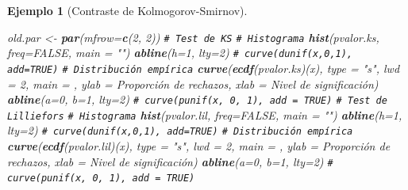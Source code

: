 \documentclass[
]{book}
\newenvironment{Shaded}{\begin{snugshade}}{\end{snugshade}}
\newcommand{\AttributeTok}[1]{\textcolor[rgb]{0.13,0.29,0.53}{#1}}
\newcommand{\CommentTok}[1]{\textcolor[rgb]{0.56,0.35,0.01}{\textit{#1}}}
\newcommand{\ConstantTok}[1]{\textcolor[rgb]{0.56,0.35,0.01}{#1}}
\newcommand{\DecValTok}[1]{\textcolor[rgb]{0.00,0.00,0.81}{#1}}
\newcommand{\FunctionTok}[1]{\textcolor[rgb]{0.13,0.29,0.53}{\textbf{#1}}}
\newcommand{\NormalTok}[1]{#1}
\newcommand{\OtherTok}[1]{\textcolor[rgb]{0.56,0.35,0.01}{#1}}
\newcommand{\StringTok}[1]{\textcolor[rgb]{0.31,0.60,0.02}{#1}}
\theoremstyle{break}
\newtheorem{example}{Ejemplo}[chapter]
\theoremstyle{nonumberplain}
\renewcommand{\CommentTok}[1]{\textcolor[rgb]{0.41,0.41,0.41}{\texttt{#1}}}
\begin{document}
\begin{example}[Contraste de Kolmogorov-Smirnov]
\begin{Shaded}
\begin{Highlighting}[]
\NormalTok{old.par }\OtherTok{\textless{}{-}} \FunctionTok{par}\NormalTok{(}\AttributeTok{mfrow=}\FunctionTok{c}\NormalTok{(}\DecValTok{2}\NormalTok{, }\DecValTok{2}\NormalTok{))}
\CommentTok{\# Test de KS}
  \CommentTok{\# Histograma}
\FunctionTok{hist}\NormalTok{(pvalor.ks, }\AttributeTok{freq=}\ConstantTok{FALSE}\NormalTok{, }\AttributeTok{main =} \StringTok{""}\NormalTok{)}
\FunctionTok{abline}\NormalTok{(}\AttributeTok{h=}\DecValTok{1}\NormalTok{, }\AttributeTok{lty=}\DecValTok{2}\NormalTok{)   }\CommentTok{\# curve(dunif(x,0,1), add=TRUE)}
  \CommentTok{\# Distribución empírica}
\FunctionTok{curve}\NormalTok{(}\FunctionTok{ecdf}\NormalTok{(pvalor.ks)(x), }\AttributeTok{type =} \StringTok{"s"}\NormalTok{, }\AttributeTok{lwd =} \DecValTok{2}\NormalTok{, }\AttributeTok{main =} \StringTok{\textquotesingle{}\textquotesingle{}}\NormalTok{, }
      \AttributeTok{ylab =} \StringTok{\textquotesingle{}Proporción de rechazos\textquotesingle{}}\NormalTok{, }\AttributeTok{xlab =} \StringTok{\textquotesingle{}Nivel de significación\textquotesingle{}}\NormalTok{)}
\FunctionTok{abline}\NormalTok{(}\AttributeTok{a=}\DecValTok{0}\NormalTok{, }\AttributeTok{b=}\DecValTok{1}\NormalTok{, }\AttributeTok{lty=}\DecValTok{2}\NormalTok{)   }\CommentTok{\# curve(punif(x, 0, 1), add = TRUE)}
\CommentTok{\# Test de Lilliefors}
  \CommentTok{\# Histograma}
\FunctionTok{hist}\NormalTok{(pvalor.lil, }\AttributeTok{freq=}\ConstantTok{FALSE}\NormalTok{, }\AttributeTok{main =} \StringTok{""}\NormalTok{)}
\FunctionTok{abline}\NormalTok{(}\AttributeTok{h=}\DecValTok{1}\NormalTok{, }\AttributeTok{lty=}\DecValTok{2}\NormalTok{)   }\CommentTok{\# curve(dunif(x,0,1), add=TRUE)}
  \CommentTok{\# Distribución empírica}
\FunctionTok{curve}\NormalTok{(}\FunctionTok{ecdf}\NormalTok{(pvalor.lil)(x), }\AttributeTok{type =} \StringTok{"s"}\NormalTok{, }\AttributeTok{lwd =} \DecValTok{2}\NormalTok{, }\AttributeTok{main =} \StringTok{\textquotesingle{}\textquotesingle{}}\NormalTok{, }
      \AttributeTok{ylab =} \StringTok{\textquotesingle{}Proporción de rechazos\textquotesingle{}}\NormalTok{,  }\AttributeTok{xlab =} \StringTok{\textquotesingle{}Nivel de significación\textquotesingle{}}\NormalTok{)}
\FunctionTok{abline}\NormalTok{(}\AttributeTok{a=}\DecValTok{0}\NormalTok{, }\AttributeTok{b=}\DecValTok{1}\NormalTok{, }\AttributeTok{lty=}\DecValTok{2}\NormalTok{)   }\CommentTok{\# curve(punif(x, 0, 1), add = TRUE)}
\end{Highlighting}
\end{Shaded}


\end{example}
\end{document}
